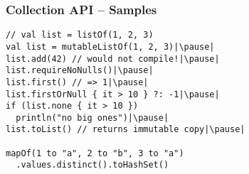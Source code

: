 \begin{frame}[fragile] \frametitle{Collection API -- Samples}
\pause
\begin{lstlisting}
// val list = listOf(1, 2, 3)
val list = mutableListOf(1, 2, 3)|\pause|
list.add(42) // would not compile!|\pause|
list.requireNoNulls()|\pause|
list.first() // => 1|\pause|
list.firstOrNull { it > 10 } ?: -1|\pause|
if (list.none { it > 10 })
  println("no big ones")|\pause|
list.toList() // returns immutable copy|\pause|

mapOf(1 to "a", 2 to "b", 3 to "a")
  .values.distinct().toHashSet()
\end{lstlisting}
\end{frame}


